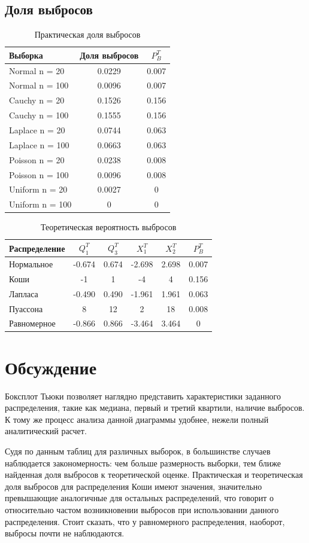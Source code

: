 \documentclass[12pt,a4paper]{article}
\begin{document}
\subsection{Доля выбросов}
\begin{table}[H]
	\centering
	\begin{tabular}{|l|c|c|}
		\hline
		Выборка & Доля выбросов	& $P^T_B$\\\hline
		\hline
		Normal n = 20 & 0.0229 & 0.007\\\hline
		Normal n = 100 & 0.0096 & 0.007\\\hline
		Cauchy n = 20 & 0.1526 & 0.156\\\hline
		Cauchy n = 100 & 0.1555 & 0.156\\\hline
		Laplace n = 20 & 0.0744 & 0.063\\\hline
		Laplace n = 100 & 0.0663 & 0.063\\\hline
		Poisson n = 20 & 0.0238 & 0.008\\\hline
		Poisson n = 100 & 0.0096 & 0.008\\\hline
		Uniform n = 20 & 0.0027 & 0\\\hline
		Uniform n = 100 & 0 & 0\\\hline
	\end{tabular}
	\caption{Практическая доля выбросов}
\end{table}

\begin{table}[H]
	\centering
	\begin{tabular}{|l|c|c|c|c|c|}
		\hline
		Распределение & $Q_1^T$	& $Q_3^T$ & $X_1^T$ & $X_2^T$ & $P_B^T$\\\hline
		\hline
		Нормальное & -0.674 & 0.674 & -2.698 &  2.698 & 0.007\\\hline
		Коши & -1 & 1 & -4 & 4 & 0.156\\\hline
		Лапласа & -0.490 & 0.490 & -1.961 & 1.961 & 0.063\\\hline
		Пуассона & 8 & 12 & 2 & 18 & 0.008\\\hline
		Равномерное & -0.866 & 0.866 & -3.464 & 3.464 & 0\\\hline
	\end{tabular}
	\caption{Теоретическая вероятность выбросов}
\end{table}

\section{Обсуждение}
Боксплот Тьюки позволяет наглядно представить характеристики заданного распределения, такие как медиана, первый и третий квартили, наличие выбросов. К тому же процесс анализа данной диаграммы удобнее, нежели полный аналитический расчет.

Судя по данным таблиц для различных выборок, в большинстве случаев наблюдается закономерность: чем больше размерность выборки, тем ближе найденная доля выбросов к теоретической оценке. Практическая и теоретическая доля выбросов для распределения Коши имеют значения, значительно превышающие аналогичные для остальных распределений, что говорит о относительно частом возникновении выбросов при использовании данного распределения. Стоит сказать, что у равномерного распределения, наоборот, выбросы почти не наблюдаются.
\end{document}

